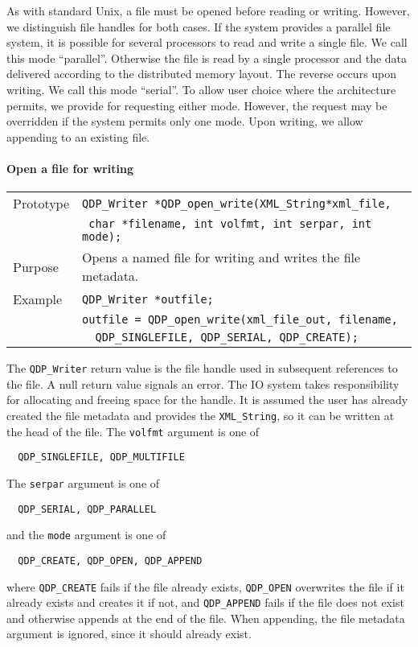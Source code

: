 \documentclass{article}
\newcommand{\QMDhandle}{{\tt XML\_String}}
\begin{document}
As with standard Unix, a file must be opened before reading or
writing.  However, we distinguish file handles for both cases.  If the
system provides a parallel file system, it is possible for several
processors to read and write a single file. We call this mode
``parallel''.  Otherwise the file is read by a single processor and
the data delivered according to the distributed memory layout.  The
reverse occurs upon writing. We call this mode ``serial''. To allow
user choice where the architecture permits, we provide for requesting
either mode.  However, the request may be overridden if the system
permits only one mode.  Upon writing, we allow appending to an
existing file.

\paragraph{Open a file for writing}

\begin{flushleft}
  \begin{tabular}{|l|l|}
  \hline
  Prototype      & \verb|QDP_Writer *QDP_open_write(|\QMDhandle \verb|*xml_file,|\\
                 & \verb| char *filename, int volfmt, int serpar, int mode);| \\
    \hline
  Purpose        & Opens a named file for writing and writes the file metadata. \\
\hline
  Example  & \verb|QDP_Writer *outfile;| \\
           & \verb|outfile = QDP_open_write(xml_file_out, filename, |\\
	   & \verb|  QDP_SINGLEFILE, QDP_SERIAL, QDP_CREATE); |\\
   \hline
 \end{tabular}
\end{flushleft}
%
The \verb|QDP_Writer| return value is the file handle used in
subsequent references to the file.  A null return value signals an
error. The IO system takes responsibility for allocating and freeing
space for the handle.  It is assumed the user has already created the
file metadata and provides the \QMDhandle, so it can be written
at the head of the file.  The \verb|volfmt| argument is one of
%
\begin{verbatim}
  QDP_SINGLEFILE, QDP_MULTIFILE
\end{verbatim}
%
The \verb|serpar| argument is one of
%
\begin{verbatim}
  QDP_SERIAL, QDP_PARALLEL
\end{verbatim}
%
and the \verb|mode| argument is one of
%
\begin{verbatim}
  QDP_CREATE, QDP_OPEN, QDP_APPEND
\end{verbatim}
%
where \verb|QDP_CREATE| fails if the file already exists,
\verb|QDP_OPEN| overwrites the file if it already exists and creates
it if not, and \verb|QDP_APPEND| fails if the file does not exist and
otherwise appends at the end of the file.  When appending, the file
metadata argument is ignored, since it should already exist.
\end{document}
